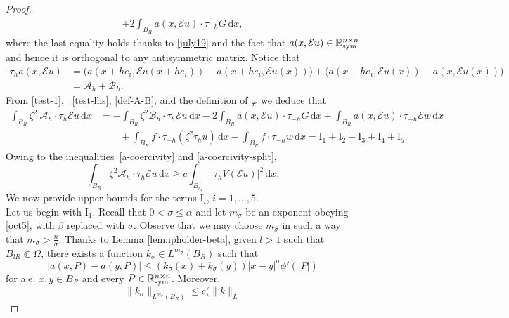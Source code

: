 \documentclass[leqno,11pt]{amsart}%
\numberwithin{equation}{section}
\def\real{\mathbb R}
\def\d{\mathrm{d}}
\def\E{\mathcal{E}}
\def\dx{\d x}
\def\Sym{\real^{n\times n}_{\textup{sym}}}
\theoremstyle{definition}
\numberwithin{equation}{section}
\begin{document}
\begin{proof}
\begin{align}
      +
      2\int_{B_R} a(x,\E u)\cdot\tau_{-h}G \,\dx,
  \end{align}
  where the last equality holds thanks to \eqref{july19} and the fact that  $a(x, \mathcal E u)\in \Sym$ and hence it is orthogonal to any antisymmetric matrix. 
   Notice that
  \begin{align}
    \label{def-A-B}
    \tau_ha(x,\E u)
    & =\big( a(x+he_i,\E u(x+h e_i))-a(x+h e_i,\E u(x))\big) +\big( a(x+he_i,\E u(x))-a(x,\E u(x))\big)\\\nonumber
    &=\mathcal{A}_h+\mathcal{B}_h.
  \end{align}
 From \eqref{test-1}, ~\eqref{test-lhs}, \eqref{def-A-B}, and the definition of $\varphi$ we deduce that
  \begin{align}\label{def-I-1-5}
    \int_{B_R}\zeta^2\ \mathcal{A}_h \cdot \tau_h\E
    u \,\dx
    &=
    -\int_{B_R}\zeta^2 \mathcal{B}_h \cdot \tau_h\E
      u \,\dx
    -2\int_{B_R}  a(x,\E u) \cdot \tau_{-h}G \,\dx +\int_{B_R}  a(x,\E u) \cdot 
    \tau_{-h}\E w \,\dx\\\nonumber
    &\qquad+ \int_{B_R}f\cdot\tau_{-h}(\zeta^2\tau_hu)\,\dx
          -\int_{B_R} f\cdot \tau_{-h}w\,\dx =
    \mathrm{I}_1+\mathrm{I}_2+\mathrm{I}_3+\mathrm{I}_4+\mathrm{I}_5.
  \end{align}
  Owing  to the inequalities~\eqref{a-coercivity} and \eqref{a-coercivity-split}, 
  \begin{equation}
    \label{lower-bound}
    \int_{B_R}\zeta^2 \mathcal{A}_h \cdot \tau_h\E
    u \,\dx
    \ge
    c\int_{B_{r_1}}|\tau_h V(\E u)|^2\,\dx.
  \end{equation}
  We now provide upper bounds for the  terms $\mathrm{I}_i$, $i=1, \dots , 5$. 
\\ Let us begin with 
 $\mathrm{I}_1$.   Recall that  $0<\sigma \leq \alpha$ and let 
  $m_\sigma$ be an exponent obeying \eqref{oct5}, with $\beta$ replaced with $\sigma$. Observe that we may choose $m_\sigma$ in such a way that $m_\sigma > \frac 
  {n}\sigma$.
 Thanks to Lemma \ref{lem:ipholder-beta},  given $l>1$ such that $B_{l R} \Subset \Omega$, there exists  a function $k_\sigma \in L^{m_\sigma}(B_R)$  such that 
  \begin{equation}
    \label{oct2}
    |a(x,P)-a(y,P)|
    \le
    (k_\sigma(x)+k_\sigma(y))|x-y|^\sigma \phi'(|P|)
\end{equation}
 for a.e. $x,y\in B_R$ and every $P\in\Sym$. Moreover,
 \begin{equation}\label{oct3}
  \|k_\sigma\|_{L^{m_\sigma}(B_R)}\le c(\|k\|_{L^{
}}
\end{equation}
\end{proof}
\end{document}
